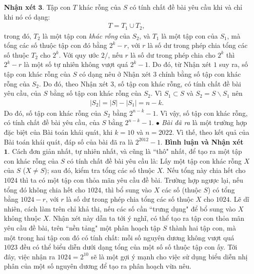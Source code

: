 \begin{multicols}{2}
	\vskip 0.05cm
	\textbf{\color{thachthuctoanhoc}Nhận xét} $\pmb{3.}$ Tập con $T$ khác rỗng của $S$ có tính chất đề bài yêu cầu khi và chỉ khi nó có dạng:
	\begin{align*}
		T = {T_1} \cup {T_2},
	\end{align*}
	trong đó, $T_2$ là một tập con \textit{khác rỗng} của $S_2$, và $T_1$ là một tập con của  $S_1$, mà tổng các số thuộc tập con đó bằng  $2^k -r$, với $r$ là số dư trong phép chia tổng các số thuộc $T_2$  cho  $2^k$.
	\vskip 0.05cm
	Với quy ước $2/$, nếu $r$ là số dư trong phép chia cho $2^k$  thì $2^k -r$ là một số tự nhiên không vượt quá  $2^k -1$. Do đó, từ Nhận xét $1$ suy ra, số tập con khác rỗng của $S$ có dạng nêu ở Nhận xét $3$ chính bằng số tập con khác rỗng của $S_2$. Do đó, theo Nhận xét $3$, số tập con khác rỗng, có tính chất đề bài yêu cầu, của $S$ bằng số tập con khác rỗng của  $S_2$.
	\vskip 0.05cm
	Vì ${S_1} \subset S$  và  ${S_2} = S \backslash S_1$ nên
	\begin{align*}
		\left| {{S_2}} \right| = \left| S \right| - \left| {{S_1}} \right| = n - k.
	\end{align*}
	Do đó, số tập con khác rỗng của  $S_2$ bằng  ${2^{n - k}} - 1$.
	\vskip 0.05cm 
	Vì vậy, số tập con khác rỗng, có tính chất đề bài yêu cầu, của $S$ bằng ${2^{n - k}} - 1$.
	\vskip 0.05cm 
	$\bullet$ \textit{Bài đã ra} là một trường hợp đặc biệt của Bài toán khái quát, khi $k = 10$ và $n = 2022$. Vì thế, theo kết quả của Bài toán khái quát, đáp số của bài đã ra là $2^{2012} -1$.
	\vskip 0.05cm 
	\textbf{\color{thachthuctoanhoc}Bình luận và Nhận xét}
	\vskip 0.05cm
	$\pmb{1.}$ Cách đơn giản nhất, tự nhiên nhất, và cũng là ``thô" nhất, để tạo ra một tập con khác rỗng của $S$ có tính chất đề bài yêu cầu là: Lấy một tập con khác rỗng $X$ của $S$ ($X \ne S$); sau đó, kiểm tra tổng các số thuộc $X$. Nếu tổng này chia hết cho $1024$ thì ta có một tập con thỏa mãn yêu cầu đề bài. Trường hợp ngược lại, nếu tổng đó không chia hết cho $1024$, thì bổ sung vào $X$ các số (thuộc $S$) có tổng bằng $1024 - r$, với $r$ là số dư trong phép chia tổng các số thuộc $X$ cho $1024$.
	\vskip 0.05cm
	Lẽ dĩ nhiên, cách làm trên chỉ khả thi, nếu các số cần ``trưng dụng" để bổ sung vào $X$ không thuộc $X$. Nhận xét này dẫn ta tới ý nghĩ, có thể tạo ra tập con thỏa mãn yêu cầu đề bài, trên ``nền tảng" một phân hoạch tập $S$ thành hai tập con, mà một trong hai tập con đó có tính chất: mỗi số nguyên dương không vượt quá $1023$ đều có thể biểu diễn dưới dạng tổng của một số số thuộc tập con ấy. Tới đây, việc nhận ra  $1024 = 2^{10}$ sẽ là một gợi ý mạnh cho việc sử dụng biểu diễn nhị phân của một số nguyên dương để tạo ra phân hoạch vừa nêu.

\end{multicols}
